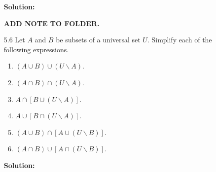 \begin{enumerate}
      \textbf{Solution:}
      
      \textbf{ADD NOTE TO FOLDER.}
   \item[5.6]  Let $A$ and $B$ be subsets of a universal set $U$. Simplify each
               of the following expressions.
               \begin{enumerate}
                  \item $(A \cup B) \cup (U{\backslash}A)$.
                  \item $(A \cap B) \cap (U{\backslash}A)$.
                  \item $A \cap [B \cup (U{\backslash}A)]$.
                  \item $A \cup [B \cap (U{\backslash}A)]$.
                  \item $(A \cup B) \cap [A \cup (U{\backslash}B)]$.
                  \item $(A \cap B) \cup [A \cap (U{\backslash}B)]$.
               \end{enumerate}
               
      \textbf{Solution:}
      

\end{enumerate}
